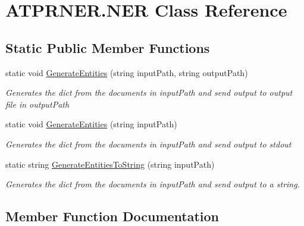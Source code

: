 \hypertarget{class_a_t_p_r_n_e_r_1_1_n_e_r}{}\section{A\+T\+P\+R\+N\+E\+R.\+N\+ER Class Reference}
\label{class_a_t_p_r_n_e_r_1_1_n_e_r}
\subsection*{Static Public Member Functions}
\begin{DoxyCompactItemize}
\item 
static void \hyperlink{class_a_t_p_r_n_e_r_1_1_n_e_r_ac52e8765543f6342e2fb0fd4283f10d7}{Generate\+Entities} (string input\+Path, string output\+Path)
\begin{DoxyCompactList}\small\item\em Generates the dict from the documents in input\+Path and send output to output file in output\+Path \end{DoxyCompactList}\item 
static void \hyperlink{class_a_t_p_r_n_e_r_1_1_n_e_r_afbf080a32a868531adb8c7f4ec5f8035}{Generate\+Entities} (string input\+Path)
\begin{DoxyCompactList}\small\item\em Generates the dict from the documents in input\+Path and send output to stdout \end{DoxyCompactList}\item 
static string \hyperlink{class_a_t_p_r_n_e_r_1_1_n_e_r_a8480137d05620d726021a2f4ae818869}{Generate\+Entities\+To\+String} (string input\+Path)
\begin{DoxyCompactList}\small\item\em Generates the dict from the documents in input\+Path and send output to a string. \end{DoxyCompactList}\end{DoxyCompactItemize}


\subsection{Member Function Documentation}
\hypertarget{class_a_t_p_r_n_e_r_1_1_n_e_r_ac52e8765543f6342e2fb0fd4283f10d7}{}\label{class_a_t_p_r_n_e_r_1_1_n_e_r_ac52e8765543f6342e2fb0fd4283f10d7} 
